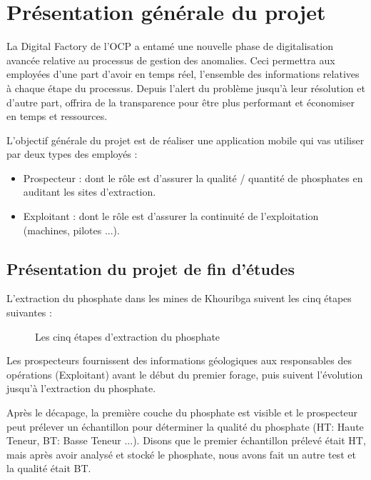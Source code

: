 \section{Pr\'esentation g\'en\'erale du projet}
La Digital Factory de l'\gls{OCP} a entam\'e une nouvelle phase de digitalisation avanc\'ee relative au processus de gestion des anomalies. Ceci permettra aux employ\'ees d'une part d'avoir en temps r\'eel, l'ensemble des informations relatives \`a chaque \'etape du processus. Depuis l'alert du probl\`eme jusqu'\`a leur r\'esolution et d'autre part, offrira de la transparence pour \^etre plus performant et \'economiser en temps et ressources.

L'objectif g\'en\'erale du projet est de r\'ealiser une application mobile qui vas utiliser par deux types des employ\'es :
\begin{itemize}
\item Prospecteur : dont le r\^ole est d'assurer la qualit\'e / quantit\'e de phosphates en auditant les sites d'extraction.
\item Exploitant : dont le r\^ole est d'assurer la continuit\'e de l'exploitation (machines, pilotes ...).
\end{itemize}
\subsection{Pr\'esentation du projet de fin d'\'etudes}
L'extraction du phosphate dans les mines de Khouribga suivent les cinq \'etapes suivantes :

\begin{figure}[!htb]
	\caption{\label{fig:my-label} Les cinq \'etapes d'extraction du phosphate}
\end{figure}

Les prospecteurs fournissent des informations g\'eologiques aux responsables des op\'erations (Exploitant) avant le d\'ebut du premier forage, puis suivent l'\'evolution jusqu'\`a l'extraction du phosphate.

Apr\`es le d\'ecapage, la premi\`ere couche du phosphate est visible et le prospecteur peut pr\'elever un \'echantillon pour d\'eterminer la qualit\'e du phosphate (HT: Haute Teneur, BT: Basse Teneur ...).
Disons que le premier \'echantillon pr\'elev\'e \'etait HT, mais apr\`es avoir analys\'e et stock\'e le phosphate, nous avons fait un autre test et la qualit\'e \'etait BT.

